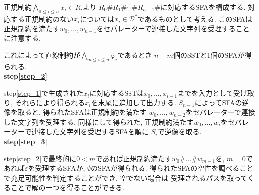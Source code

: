 \documentclass[uplatex,dvipdfmx,a4j]{jsreport}
\begin{document}
  正規制約$\bigwedge_{0 \leq i \le n} x_i \in R_i$より
  $R_0 \# R_1 \# \cdots \# R_{n - 1} \#$に対応するSFAを構成する.
  対応する正規制約のない$x_i$については$x_i \in \mathcal{D}^*$であるものとして考える.
  このSFAは正規制約を満たす$w_0, \ldots, w_{n - 1}$をセパレーターで連接した文字列を受理することに注意する.

  これによって直線制約が$\bigwedge_{m \leq i \le n} \varphi_i$であるとき
  $n - m$個のSSTと1個のSFAが得られる. \\
  {\bf step\ref{step_2}}

  step\ref{step_1}で生成された$x_i$に対応するSSTは$x_0, \ldots, x_{i - 1}$までを入力として受け取り,
  それらにより得られる$x_i$を末尾に追加して出力する.
  $S_{n - 1}$によってSFAの逆像を取ると, 得られたSFAは正規制約を満たす
  $w_0, \ldots, w_{n - 2}$をセパレーターで連接した文字列を受理する.
  同様にして得られた, 正規制約満たす$w_0, \ldots, w_i$をセパレーターで連接した文字列を受理するSFAを順に
  $S_i$で逆像を取る.  \\
  {\bf step\ref{step_3}}

  step\ref{step_2}で最終的に$0 < m$であれば正規制約満たす$w_0 \# \ldots \# w_{m - 1}$を,
  $m = 0$であれば$\varepsilon$を受理するSFAか, $\emptyset$のSFAが得られる.
  得られたSFAの空性を調べることで充足可能性を判定することができ, 空でない場合は
  受理されるパスを取ってくることで解の一つを得ることができる.
\end{document}

